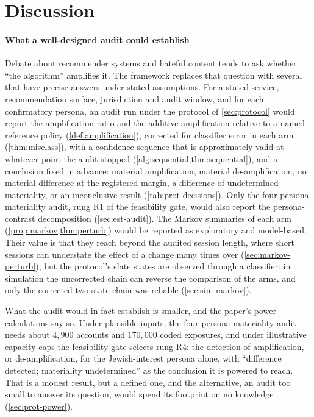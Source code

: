 \section{Discussion}\label{sec:discussion}

\paragraph{What a well-designed audit could establish}
Debate about recommender systems and hateful content tends to ask whether
``the algorithm'' amplifies it. The framework replaces that question with
several that have precise answers under stated assumptions. For a stated
service, recommendation surface, jurisdiction and audit window, and for each
confirmatory persona, an audit run under the protocol of \cref{sec:protocol}
would report the amplification ratio and the additive amplification relative
to a named reference policy (\cref{def:amplification}), corrected for
classifier error in each arm (\cref{thm:misclass}), with a confidence sequence
that is approximately valid at whatever point the audit stopped
(\cref{alg:sequential,thm:sequential}), and a conclusion fixed in advance:
material amplification, material de-amplification, no material difference at
the registered margin, a difference of undetermined materiality, or an
inconclusive result (\cref{tab:prot-decisions}). Only the four-persona
materiality audit, rung R1 of the feasibility gate, would also report the
persona-contrast decomposition (\cref{sec:est-audit}).
The Markov summaries of each arm (\cref{prop:markov,thm:perturb}) would be
reported as exploratory and model-based. Their value is that they reach beyond
the audited session length, where short sessions can understate the effect of
a change many times over (\cref{sec:markov-perturb}), but the protocol's slate
states are observed through a classifier: in simulation the uncorrected chain
can reverse the comparison of the arms, and only the corrected two-state chain
was reliable (\cref{sec:sim-markov}).

What the audit would in fact establish is smaller, and the paper's power
calculations say so. Under plausible inputs, the four-persona materiality
audit needs about $4{,}900$ accounts and $170{,}000$ coded exposures, and
under illustrative capacity caps the feasibility gate selects rung R4: the
detection of amplification, or de-amplification, for the Jewish-interest
persona alone, with ``difference detected; materiality undetermined'' as the
conclusion it is powered to reach. That is a modest result, but a defined
one, and the alternative, an audit too small to answer its question, would
spend its footprint on no knowledge (\cref{sec:prot-power}).

